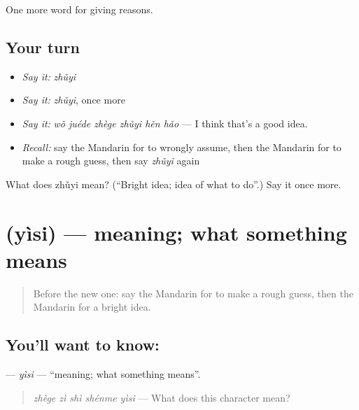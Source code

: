 \begin{grammarlens}[title={What you've built}]
One more word for giving reasons.
\end{grammarlens}

\subsection*{Your turn}
\begin{itemize}
\raggedright
  \item \emph{Say it:} \emph{zhǔyi}
  \item \emph{Say it:} \emph{zhǔyi}, once more
  \item \emph{Say it:} \emph{wǒ juéde zhège zhǔyi hěn hǎo} — I think that's a good idea.
  \item \emph{Recall:} say the Mandarin for to wrongly assume, then the Mandarin for to make a rough guess, then say \emph{zhǔyi} again
\end{itemize}

\begin{tcolorbox}[breakable,colback=teal!4,colframe=teal!35!black,title={Before you move on}]
What does zhǔyi mean? (\textquotedblleft{}Bright idea; idea of what to do\textquotedblright{}.) Say it once more.
\end{tcolorbox}
\section[\texorpdfstring{\zh{意思} (yìsi)}{意思 (yìsi)}]{ (yìsi) — meaning; what something means}

\label{lesson:ZH-C347-yisi}



\begin{quote}
Before the new one: say the Mandarin for to make a rough guess, then the Mandarin for a bright idea.
\end{quote}

\subsection*{You'll want to know: }
\textbf{} — \emph{yìsi} — \textquotedblleft{}meaning; what something means\textquotedblright{}.

\begin{quote}
\textbf{} \emph{zhège zì shì shénme yìsi} — What does this character mean?
\end{quote}

